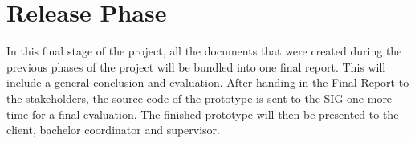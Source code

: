 \section{Release Phase}
In this final stage of the project, all the documents that were created during the previous phases of the project will be bundled into one final report. This will include a general conclusion and evaluation. After handing in the Final Report to the stakeholders, the source code of the prototype is sent to the SIG one more time for a final evaluation. The finished prototype will then be presented to the client, bachelor coordinator and supervisor. 